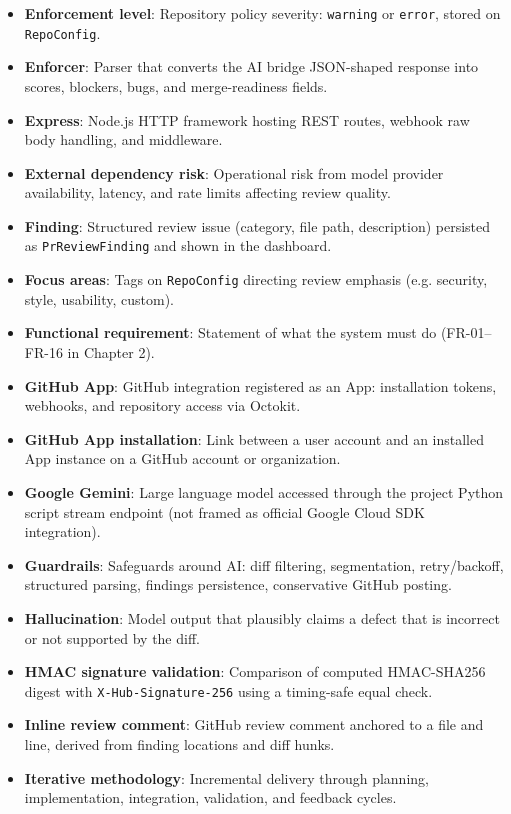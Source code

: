 \begin{itemize}
\item \textbf{Enforcement level}: Repository policy severity: \texttt{warning} or \texttt{error}, stored on \texttt{RepoConfig}.
\item \textbf{Enforcer}: Parser that converts the AI bridge JSON-shaped response into scores, blockers, bugs, and merge-readiness fields.
\item \textbf{Express}: Node.js HTTP framework hosting REST routes, webhook raw body handling, and middleware.
\item \textbf{External dependency risk}: Operational risk from model provider availability, latency, and rate limits affecting review quality.
\item \textbf{Finding}: Structured review issue (category, file path, description) persisted as \texttt{PrReviewFinding} and shown in the dashboard.
\item \textbf{Focus areas}: Tags on \texttt{RepoConfig} directing review emphasis (e.g. security, style, usability, custom).
\item \textbf{Functional requirement}: Statement of what the system must do (FR-01--FR-16 in Chapter 2).
\item \textbf{GitHub App}: GitHub integration registered as an App: installation tokens, webhooks, and repository access via Octokit.
\item \textbf{GitHub App installation}: Link between a user account and an installed App instance on a GitHub account or organization.
\item \textbf{Google Gemini}: Large language model accessed through the project Python script stream endpoint (not framed as official Google Cloud SDK integration).
\item \textbf{Guardrails}: Safeguards around AI: diff filtering, segmentation, retry/backoff, structured parsing, findings persistence, conservative GitHub posting.
\item \textbf{Hallucination}: Model output that plausibly claims a defect that is incorrect or not supported by the diff.
\item \textbf{HMAC signature validation}: Comparison of computed HMAC-SHA256 digest with \texttt{X-Hub-Signature-256} using a timing-safe equal check.
\item \textbf{Inline review comment}: GitHub review comment anchored to a file and line, derived from finding locations and diff hunks.
\item \textbf{Iterative methodology}: Incremental delivery through planning, implementation, integration, validation, and feedback cycles.

\end{itemize}
